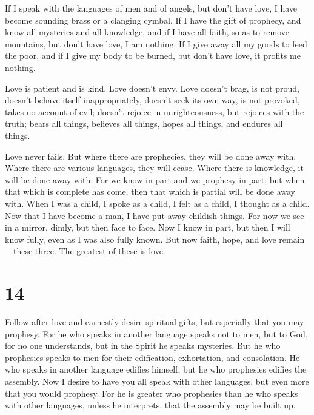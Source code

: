  If I speak with the languages of men and of angels, but
don't have love, I have become sounding brass or a clanging cymbal.
 If I have the gift of prophecy, and know all mysteries
and all knowledge, and if I have all faith, so as to remove mountains,
but don't have love, I am nothing.  If I give away all my
goods to feed the poor, and if I give my body to be burned, but don't
have love, it profits me nothing.

 Love is patient and is kind. Love doesn't envy. Love
doesn't brag, is not proud,  doesn't behave itself
inappropriately, doesn't seek its own way, is not provoked, takes no
account of evil;  doesn't rejoice in unrighteousness, but
rejoices with the truth;  bears all things, believes all
things, hopes all things, and endures all things.

 Love never fails. But where there are prophecies, they
will be done away with. Where there are various languages, they will
cease. Where there is knowledge, it will be done away with.
 For we know in part and we prophesy in part;
 but when that which is complete has come, then that
which is partial will be done away with.  When I was a
child, I spoke as a child, I felt as a child, I thought as a child. Now
that I have become a man, I have put away childish things.
 For now we see in a mirror, dimly, but then face to
face. Now I know in part, but then I will know fully, even as I was also
fully known.  But now faith, hope, and love
remain---these three. The greatest of these is love.

\hypertarget{section-13}{%
\section{14}\label{section-13}}

 Follow after love and earnestly desire spiritual gifts,
but especially that you may prophesy.  For he who speaks
in another language speaks not to men, but to God, for no one
understands, but in the Spirit he speaks mysteries.  But
he who prophesies speaks to men for their edification, exhortation, and
consolation.  He who speaks in another language edifies
himself, but he who prophesies edifies the assembly.  Now
I desire to have you all speak with other languages, but even more that
you would prophesy. For he is greater who prophesies than he who speaks
with other languages, unless he interprets, that the assembly may be
built up.

